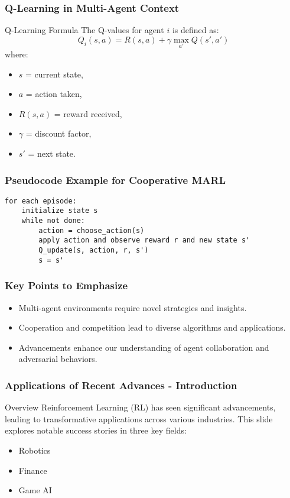 \documentclass[aspectratio=169]{beamer}
\begin{document}
\begin{frame}[fragile]
    \frametitle{Q-Learning in Multi-Agent Context}
    \begin{block}{Q-Learning Formula}
        The Q-values for agent $i$ is defined as:
        \begin{equation}
            Q_i(s, a) = R(s, a) + \gamma \max_{a'} Q(s', a')
        \end{equation}
        where:
        \begin{itemize}
            \item $s$ = current state,
            \item $a$ = action taken,
            \item $R(s, a)$ = reward received,
            \item $\gamma$ = discount factor,
            \item $s'$ = next state.
        \end{itemize}
    \end{block}
\end{frame}

\begin{frame}[fragile]
    \frametitle{Pseudocode Example for Cooperative MARL}
    \begin{lstlisting}
for each episode:
    initialize state s
    while not done:
        action = choose_action(s)
        apply action and observe reward r and new state s'
        Q_update(s, action, r, s')
        s = s'
    \end{lstlisting}
\end{frame}

\begin{frame}[fragile]
    \frametitle{Key Points to Emphasize}
    \begin{itemize}
        \item Multi-agent environments require novel strategies and insights.
        \item Cooperation and competition lead to diverse algorithms and applications.
        \item Advancements enhance our understanding of agent collaboration and adversarial behaviors.
    \end{itemize}
\end{frame}

\begin{frame}[fragile]
    \frametitle{Applications of Recent Advances - Introduction}
    \begin{block}{Overview}
        Reinforcement Learning (RL) has seen significant advancements, leading to transformative applications across various industries.
        This slide explores notable success stories in three key fields: 
        \begin{itemize}
            \item Robotics
            \item Finance
            \item Game AI
        \end{itemize}
    \end{block}
\end{frame}
\end{document}

